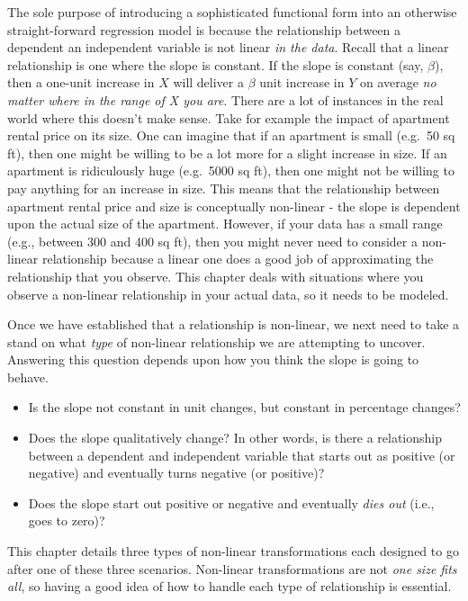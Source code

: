 \documentclass[
]{book}
\begin{document}
The sole purpose of introducing a sophisticated functional form into an otherwise straight-forward regression model is because the relationship between a dependent an independent variable is not linear \emph{in the data}. Recall that a linear relationship is one where the slope is constant. If the slope is constant (say, \(\beta\)), then a one-unit increase in \(X\) will deliver a \(\beta\) unit increase in \(Y\) on average \emph{no matter where in the range of X you are}. There are a lot of instances in the real world where this doesn't make sense. Take for example the impact of apartment rental price on its size. One can imagine that if an apartment is small (e.g.~50 sq ft), then one might be willing to be a lot more for a slight increase in size. If an apartment is ridiculously huge (e.g.~5000 sq ft), then one might not be willing to pay anything for an increase in size. This means that the relationship between apartment rental price and size is conceptually non-linear - the slope is dependent upon the actual size of the apartment. However, if your data has a small range (e.g., between 300 and 400 sq ft), then you might never need to consider a non-linear relationship because a linear one does a good job of approximating the relationship that you observe. This chapter deals with situations where you observe a non-linear relationship in your actual data, so it needs to be modeled.

Once we have established that a relationship is non-linear, we next need to take a stand on what \emph{type} of non-linear relationship we are attempting to uncover. Answering this question depends upon how you think the slope is going to behave.

\begin{itemize}
\item
  Is the slope not constant in unit changes, but constant in percentage changes?
\item
  Does the slope qualitatively change? In other words, is there a relationship between a dependent and independent variable that starts out as positive (or negative) and eventually turns negative (or positive)?
\item
  Does the slope start out positive or negative and eventually \emph{dies out} (i.e., goes to zero)?
\end{itemize}

This chapter details three types of non-linear transformations each designed to go after one of these three scenarios. Non-linear transformations are not \emph{one size fits all}, so having a good idea of how to handle each type of relationship is essential.
\end{document}
